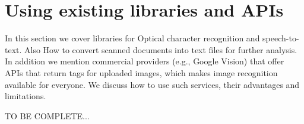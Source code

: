\section{Using existing libraries and APIs}
\label{sec:apivisions}

In this section we cover libraries for Optical character recognition and speech-to-text. Also How to convert scanned documents into text files for further analysis. In addition we mention commercial providers (e.g., Google Vision) that offer APIs that return tags for uploaded images, which makes image recognition available for everyone. We discuss how to use such services, their advantages and limitations.


TO BE COMPLETE...
